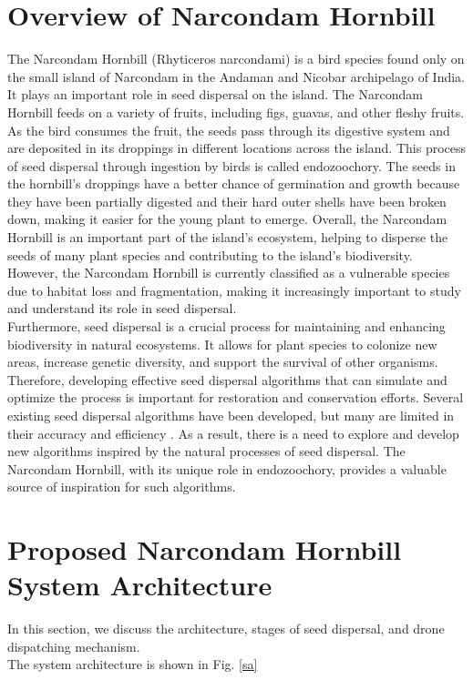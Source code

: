\documentclass[conference]{IEEEtran}
\begin{document}
\section{Overview of Narcondam Hornbill}
The Narcondam Hornbill (Rhyticeros narcondami) is a bird species found only on the small island of Narcondam\cite{5} in the Andaman and Nicobar archipelago of India. It plays an important role in seed dispersal on the island. The Narcondam Hornbill feeds on a variety of fruits, including figs, guavas, and other fleshy fruits. As the bird consumes the fruit, the seeds pass through its digestive system and are deposited in its droppings in different locations across the island. This process of seed dispersal through ingestion by birds is called endozoochory. The seeds in the hornbill's droppings have a better chance of germination and growth because they have been partially digested and their hard outer shells have been broken down, making it easier for the young plant to emerge. Overall, the Narcondam Hornbill is an important part of the island's ecosystem, helping to disperse the seeds of many plant species and contributing to the island's biodiversity. However, the Narcondam Hornbill is currently classified as a vulnerable species due to habitat loss and fragmentation, making it increasingly important to study and understand its role in seed dispersal.
\\Furthermore, seed dispersal is a crucial process for maintaining and enhancing biodiversity in natural ecosystems. It allows for plant species to colonize new areas, increase genetic diversity, and support the survival of other organisms. Therefore, developing effective seed dispersal algorithms that can simulate and optimize the process is important for restoration and conservation efforts. Several existing seed dispersal algorithms have been developed, but many are limited in their accuracy and efficiency \cite{6}. As a result, there is a need to explore and develop new algorithms inspired by the natural processes of seed dispersal. The Narcondam Hornbill, with its unique role in endozoochory, provides a valuable source of inspiration for such algorithms.

\section{Proposed Narcondam Hornbill System Architecture}

In this section, we discuss the architecture, stages of seed dispersal, and drone dispatching mechanism.
\\The system architecture is shown in Fig. \ref{sa}
\end{document}
